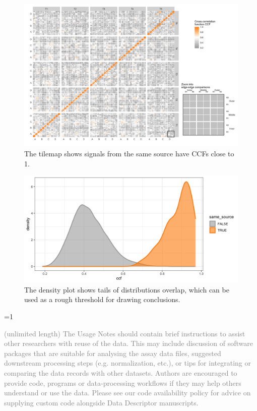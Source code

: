 \documentclass[fleqn,10pt]{wlscirep}
\newcommand{\ifinstruction}{0} %
\begin{document}
\begin{figure}[ht]
\centering
\includegraphics[width=0.8\linewidth]{ccf_tilemap.png}
\caption{The tilemap shows signals from the same source have CCFs close to 1.}
\label{fig-ccf-tilemap}
\end{figure}

\begin{figure}[ht]
\centering
\includegraphics[width=0.8\linewidth]{ccf_density.png}
\caption{The density plot shows tails of distributions overlap, which can be used as a rough threshold for drawing conclusions.}
\label{fig-ccf-density}
\end{figure}

\ifnum \ifinstruction=1

\textcolor{gray}{(unlimited length) The Usage Notes should contain brief instructions to assist other researchers with reuse of the data. This may include discussion of software packages that are suitable for analysing the assay data files, suggested downstream processing steps (e.g. normalization, etc.), or tips for integrating or comparing the data records with other datasets. Authors are encouraged to provide code, programs or data-processing workflows if they may help others understand or use the data. Please see our code availability policy for advice on supplying custom code alongside Data Descriptor manuscripts.}
\end{document}
